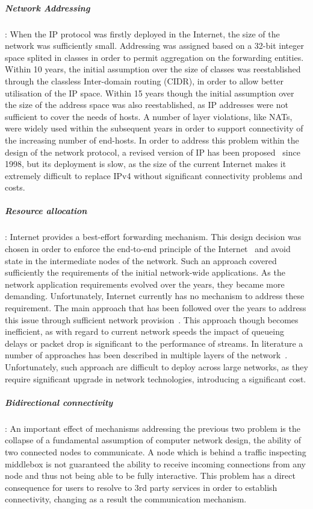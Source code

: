 \subparagraph*{Network Addressing}: When the IP protocol was firstly deployed in
the Internet, the size of the network was sufficiently small. Addressing was
assigned based on a 32-bit integer space splited in classes in order to permit
aggregation on the forwarding entities. Within 10 years, the initial assumption
over the size of classes was reestablished through the classless Inter-domain
routing (CIDR), in order to allow better utilisation of the IP space. Within 15
years  though the initial assumption over the size of the address space was also 
reestablished, as IP addresses were not sufficient to cover the needs of hosts.
A number of layer violations, like NATs, were widely used within the subsequent
years in order to support connectivity of the increasing number of end-hosts. In
order to address this problem within the design of the network protocol, a
revised version of IP has been proposed~\cite{RFC2460} since 1998, but its
deployment is slow, as the size of the current Internet makes it extremely
difficult to replace IPv4 without significant connectivity problems and costs.

\subparagraph*{Resource allocation}: Internet provides 
a best-effort forwarding mechanism. This design decision was chosen in order to
enforce the end-to-end principle of the Internet~\cite{end2endIP} and avoid
state in the intermediate nodes of the network. Such an approach covered 
sufficiently the requirements of the initial network-wide applications. As the
network application requirements evolved over the years, they became more
demanding. Unfortunately, Internet currently has no mechanism to address these
requirement. The main approach that has been followed over the years to address
this issue through sufficient network provision~\cite{TeiSha02}. This approach
though becomes inefficient, as with regard to current network speeds the impact
of queueing delays or packet drop is significant to the performance of streams.
In literature a number of approaches has been described in multiple layers of
the network~\cite{RFC5562, RFC2475, RFC3135}. Unfortunately, such approach are
difficult to deploy across large networks, as they require significant upgrade
in network technologies, introducing a significant cost. 

\subparagraph*{Bidirectional connectivity}: An important effect of mechanisms
addressing the previous two problem is the collapse of a fundamental assumption
of computer network design, the ability of two connected nodes to communicate. A
node which is behind a traffic inspecting middlebox is not guaranteed the
ability to receive incoming connections from any node and thus not being able to
be fully interactive. This problem has a direct consequence for users to resolve
to 3rd party services in order to establish connectivity, changing as a result
the communication mechanism. 

